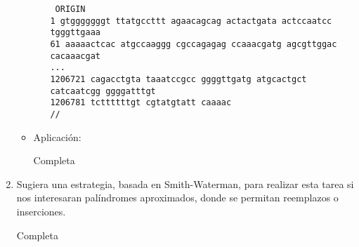 \begin{enumerate}
\begin{itemize}
\begin{itemize}
					\texttt{
					ORIGIN\\ 
		        1 gtgggggggt ttatgccttt agaacagcag actactgata actccaatcc tgggttgaaa\\
		      	61 aaaaactcac atgccaaggg cgccagagag ccaaacgatg agcgttggac cacaaacgat\\
				...\\
				1206721 cagacctgta taaatccgcc ggggttgatg atgcactgct catcaatcgg ggggatttgt\\
  				1206781 tcttttttgt cgtatgtatt caaaac\\
					//
					}
				\end{itemize}

			\item Aplicación:
			
			  Completa
		\end{itemize}

	\item Sugiera una estrategia, basada en Smith-Waterman, para realizar esta tarea si nos interesaran
		palíndromes aproximados, donde se permitan reemplazos o inserciones.


			 Completa

\end{enumerate}
